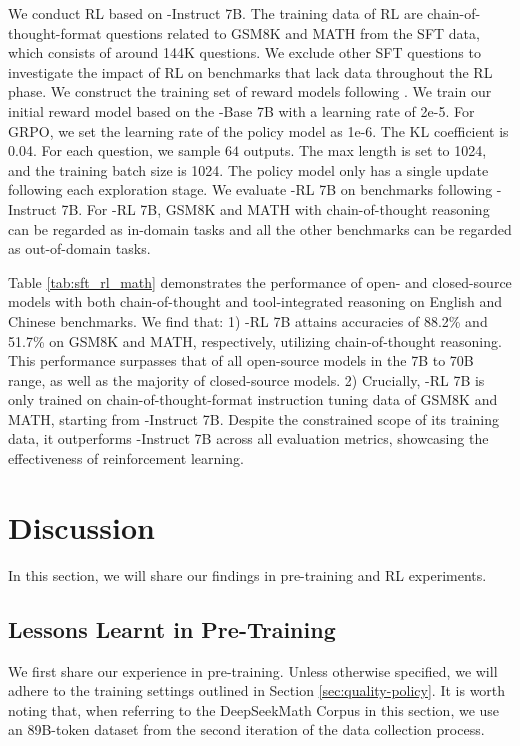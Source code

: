 We conduct RL based on \spmath-Instruct 7B.
The training data of RL are chain-of-thought-format questions related to GSM8K and MATH from the SFT data, which consists of around 144K questions. 
We exclude other SFT questions to investigate the impact of RL on benchmarks that lack data throughout the RL phase.
We construct the training set of reward models following \citep{wang2023math}.
We train our initial reward model based on the \spmath-Base 7B with a learning rate of 2e-5.
For GRPO, we set the learning rate of the policy model as 1e-6. The KL coefficient is 0.04. For each question, we sample $64$ outputs.  The max length is set to 1024, and the training batch size is 1024.
The policy model only has a single update following each
exploration stage.
We evaluate \spmath-RL 7B on benchmarks following \spmath-Instruct 7B.
For \spmath-RL 7B, GSM8K and MATH with chain-of-thought reasoning can be regarded as in-domain tasks and all the other benchmarks can be regarded as out-of-domain tasks.

Table \ref{tab:sft_rl_math} demonstrates the performance of open- and closed-source models with both chain-of-thought and tool-integrated reasoning on English and Chinese benchmarks. We find that:
1) \spmath-RL 7B attains accuracies of 88.2\% and 51.7\% on GSM8K and MATH, respectively, utilizing chain-of-thought reasoning. This performance surpasses that of all open-source models in the 7B to 70B range, as well as the majority of closed-source models. 
2) Crucially, \spmath-RL 7B is only trained on chain-of-thought-format instruction tuning data of GSM8K and MATH, starting from \spmath-Instruct 7B. Despite the constrained scope of its training data, it outperforms \spmath-Instruct 7B across all evaluation metrics, showcasing the effectiveness of reinforcement learning.

\section{Discussion}
In this section, we will share our findings in pre-training and RL experiments. 

\subsection{Lessons Learnt in Pre-Training}

We first share our experience in pre-training. Unless otherwise specified, we will adhere to the training settings outlined in Section \ref{sec:quality-policy}. It is worth noting that, when referring to the DeepSeekMath Corpus in this section, we use an 89B-token dataset from the second iteration of the data collection process.

